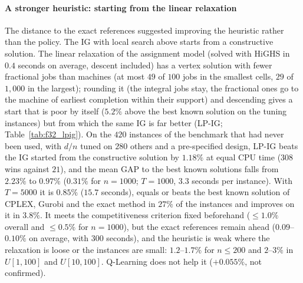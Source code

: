 \documentclass[final,3p,times,11pt,authoryear]{elsarticle}
\begin{document}
\paragraph{A stronger heuristic: starting from the linear relaxation}
The distance to the exact references suggested improving the heuristic rather than the policy. The IG with local search above starts from a constructive solution. The linear relaxation of the assignment model (solved with HiGHS in $0.4$ seconds on average, descent included) has a vertex solution with fewer fractional jobs than machines (at most $49$ of $100$ jobs in the smallest cells, $29$ of $1{,}000$ in the largest); rounding it (the integral jobs stay, the fractional ones go to the machine of earliest completion within their support) and descending gives a start that is poor by itself ($5.2\%$ above the best known solution on the tuning instances) but from which the same IG is far better (LP-IG; Table~\ref{tab:f32_lpig}). On the $420$ instances of the benchmark that had never been used, with $d/n$ tuned on $280$ others and a pre-specified design, LP-IG beats the IG started from the constructive solution by $1.18\%$ at equal CPU time ($308$ wins against $21$), and the mean GAP to the best known solutions falls from $2.23\%$ to $0.97\%$ ($0.31\%$ for $n=1000$; $T=1000$, $3.3$ seconds per instance). With $T=5000$ it is $0.85\%$ ($15.7$ seconds), equals or beats the best known solution of CPLEX, Gurobi and the exact method in $27\%$ of the instances and improves on it in $3.8\%$. It meets the competitiveness criterion fixed beforehand ($\leq1.0\%$ overall and $\leq0.5\%$ for $n=1000$), but the exact references remain ahead ($0.09$--$0.10\%$ on average, with 300 seconds), and the heuristic is weak where the relaxation is loose or the instances are small: $1.2$--$1.7\%$ for $n\leq200$ and $2$--$3\%$ in $U[1,100]$ and $U[10,100]$. Q-Learning does not help it ($+0.055\%$, not confirmed).


\end{document}
